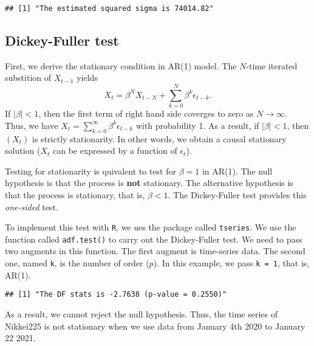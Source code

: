 \documentclass[
  12pt,
]{article}
\newenvironment{Shaded}{\begin{snugshade}}{\end{snugshade}}
\newcommand{\DataTypeTok}[1]{\textcolor[rgb]{0.13,0.29,0.53}{#1}}
\newcommand{\DecValTok}[1]{\textcolor[rgb]{0.00,0.00,0.81}{#1}}
\newcommand{\KeywordTok}[1]{\textcolor[rgb]{0.13,0.29,0.53}{\textbf{#1}}}
\newcommand{\NormalTok}[1]{#1}
\newcommand{\OperatorTok}[1]{\textcolor[rgb]{0.81,0.36,0.00}{\textbf{#1}}}
\newcommand{\StringTok}[1]{\textcolor[rgb]{0.31,0.60,0.02}{#1}}
\begin{document}
\begin{Shaded}
\end{Shaded}

\begin{verbatim}
## [1] "The estimated squared sigma is 74014.82"
\end{verbatim}

\hypertarget{dickey-fuller-test}{%
\subsection{Dickey-Fuller test}\label{dickey-fuller-test}}

First, we derive the stationary condition in AR(1) model. The \(N\)-time
iterated substition of \(X_{t-1}\) yields
\[ X_t = \beta^N X_{t-N} + \sum_{k = 0}^N \beta^k \epsilon_{t-k}. \] If
\(|\beta| < 1\), then the first term of right hand side coverges to zero
as \(N \to \infty\). Thus, we have
\(X_t = \sum_{k=0}^{\infty} \beta^k \epsilon_{t-k}\) with probability 1.
As a result, if \(|\beta| < 1\), then \((X_t)\) is strictly
stationarity. In other words, we obtain a causal stationary solution
(\(X_t\) can be expressed by a function of \(\epsilon_t\)).

Testing for stationarity is quivalent to test for \(\beta = 1\) in
AR(1). The null hypothesis is that the process is \textbf{not}
stationary. The alternative hypothesis is that the process is
stationary, that is, \(\beta < 1\). The Dickey-Fuller test provides this
\emph{one-sided} test.

To implement this test with \texttt{R}, we ues the package called
\texttt{tseries}. We use the function called \texttt{adf.test()} to
carry out the Dickey-Fuller test. We need to pass two augments in this
function. The first augment is time-series data. The second one, named
\texttt{k}, is the number of order (\(p\)). In this example, we pass
\texttt{k\ =\ 1}, that is, AR(1).

\begin{Shaded}
\end{Shaded}

\begin{verbatim}
## [1] "The DF stats is -2.7638 (p-value = 0.2550)"
\end{verbatim}

As a result, we cannot reject the null hypothesis. Thus, the time series
of Nikkei225 is not stationary when we use data from January 4th 2020 to
January 22 2021.
\end{document}
